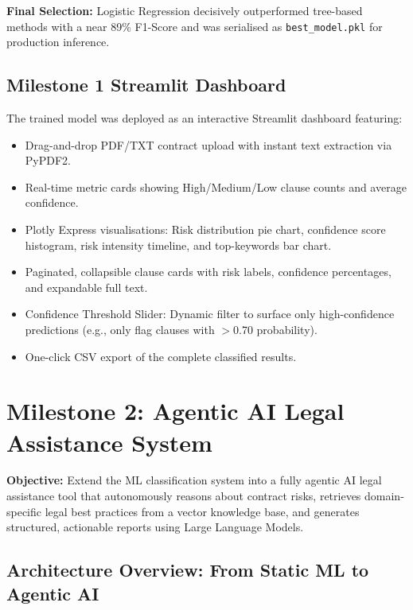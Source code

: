 \documentclass[12pt,a4paper]{article}
\begin{document}
\textbf{Final Selection:} Logistic Regression decisively outperformed tree-based
methods with a near 89\% F1-Score and was serialised as \texttt{best\_model.pkl}
for production inference.

\subsection{Milestone 1 Streamlit Dashboard}

The trained model was deployed as an interactive Streamlit dashboard featuring:

\begin{itemize}[leftmargin=1.5cm]
    \item Drag-and-drop PDF/TXT contract upload with instant text extraction via PyPDF2.
    \item Real-time metric cards showing High/Medium/Low clause counts and average
    confidence.
    \item Plotly Express visualisations: Risk distribution pie chart, confidence score
    histogram, risk intensity timeline, and top-keywords bar chart.
    \item Paginated, collapsible clause cards with risk labels, confidence percentages,
    and expandable full text.
    \item Confidence Threshold Slider: Dynamic filter to surface only
    high-confidence predictions (e.g., only flag clauses with $>$0.70 probability).
    \item One-click CSV export of the complete classified results.
\end{itemize}

\section{Milestone 2: Agentic AI Legal Assistance System}
\label{sec:milestone2}

\begin{tcolorbox}[colback=gray!5, colframe=gray!50]
\textbf{Objective:} Extend the ML classification system into a fully agentic AI
legal assistance tool that autonomously reasons about contract risks, retrieves
domain-specific legal best practices from a vector knowledge base, and generates
structured, actionable reports using Large Language Models.
\end{tcolorbox}

\subsection{Architecture Overview: From Static ML to Agentic AI}
\end{document}

